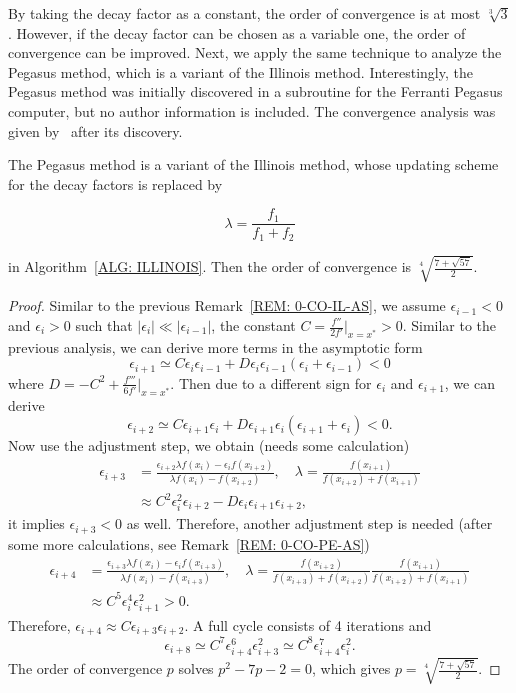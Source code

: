 By taking the decay factor as a constant, the order of convergence is at most $\sqrt[3]{3}$. However, if the decay factor can be chosen as a variable one, the order of convergence can be improved. Next, we apply the same technique to analyze the Pegasus method, which is a variant of the Illinois method. Interestingly, the Pegasus method was initially discovered in a subroutine for the Ferranti Pegasus computer, but no author information is included. The convergence analysis was given by~\cite{dowell1972pegasus} after its discovery.

\begin{theorem}
    \label{THM: 0-PE-ME}
The Pegasus method is a variant of the Illinois method, whose updating scheme for the decay factors is replaced by 

$$\lambda=\frac{f_1}{f_1+f_2}$$ 

in Algorithm~\ref{ALG: ILLINOIS}. Then the order of convergence is $\sqrt[4]{\frac{7+\sqrt{57}}{2}}$.    
\end{theorem}

\begin{proof}
Similar to the previous Remark~\ref{REM: 0-CO-IL-AS}, we assume $\epsilon_{i-1} < 0$ and $\epsilon_{i} > 0$ such that $|\epsilon_i|\ll |\epsilon_{i-1}|$, the constant $C = \frac{f''}{2f'}|_{x=x^{\ast}} > 0$.
Similar to the previous analysis, we can derive more terms in the asymptotic form
$$
\epsilon_{i+1}\simeq C \epsilon_{i}\epsilon_{i-1} + D \epsilon_{i} \epsilon_{i-1}(\epsilon_{i} + \epsilon_{i-1})< 0
$$
where $D = -C^2 + \frac{f'''}{6f'}|_{x=x^{\ast}}$. Then due to a different sign for $\epsilon_{i}$ and $\epsilon_{i+1}$, we can derive 
$$\epsilon_{i+2}\simeq C \epsilon_{i+1}\epsilon_{i} + D \epsilon_{i+1} \epsilon_{i}(\epsilon_{i+1} + \epsilon_{i}) < 0.$$
Now use the adjustment step, we obtain (needs some calculation)
$$
\begin{aligned}
\epsilon_{i+3} &= \frac{\epsilon_{i+2}\lambda f(x_i) - \epsilon_i f(x_{i+2})}{\lambda f(x_{i}) - f(x_{i+2})},\quad \lambda = \frac{f(x_{i+1})}{f(x_{i+2}) + f(x_{i+1})}\\
&\approx C^2 \epsilon_{i}^2\epsilon_{i+2} - D \epsilon_{i} \epsilon_{i+1} \epsilon_{i+2}, 
\end{aligned}
$$
it implies $\epsilon_{i+3} < 0$ as well. Therefore, another adjustment step is needed (after some more calculations, see Remark~\ref{REM: 0-CO-PE-AS})
$$
\begin{aligned}
\epsilon_{i+4} &=  \frac{\epsilon_{i+3}\lambda f(x_i) - \epsilon_i f(x_{i+3})}{\lambda f(x_{i}) - f(x_{i+3})},\quad \lambda = \frac{f(x_{i+2})}{f(x_{i+3}) + f(x_{i+2})}\frac{f(x_{i+1})}{f(x_{i+2}) + f(x_{i+1})}\\
&\approx C^5 \epsilon_{i}^4\epsilon_{i+1}^2 > 0.
\end{aligned}
$$
Therefore, $\epsilon_{i+4}\approx C \epsilon_{i+3} \epsilon_{i+2}$. A full cycle consists of 4 iterations and 
$$
\epsilon_{i+8} \simeq C^7 \epsilon_{i+4}^6 \epsilon_{i+3}^2 \simeq C^{8}\epsilon_{i+4}^7 \epsilon_i^2.
$$
The order of convergence $p$ solves $p^2 - 7p - 2 = 0$, which gives $p = \sqrt[4]{\frac{7+\sqrt{57}}{2}}$.
\end{proof}

